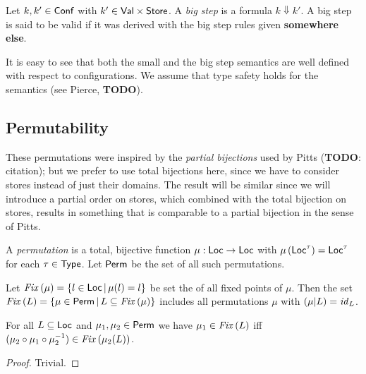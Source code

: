 \documentclass[12pt,a4paper]{report}
\newcommand{\Conf}{\sstyle{Conf}}
\newcommand{\id}{\nstyle{id}}
\newcommand{\Fix}[1]{\nstyle{Fix}\,(#1)}
\begin{document}
\begin{definition}
  Let $k,k'\in\Conf$ with $k' \in \mathsf{Val} \times \mathsf{Store}$. A {\em big step} is a formula
  $k \Downarrow k'$. A big step is said to be valid if it was derived with the
  big step rules given {\bf somewhere else}.
\end{definition}

It is easy to see that both the small and the big step semantics are well defined
with respect to configurations. We assume that type safety holds for the semantics
(see Pierce, {\bf TODO}).



\subsection{Permutability}

These permutations were inspired by the {\em partial bijections} used by Pitts ({\bf TODO}: citation);
but we prefer to use total bijections here, since we have to consider stores instead of just their domains.
The result will be similar since we will introduce a partial order on stores, which combined with the
total bijection on stores, results in something that is comparable to a partial bijection in the sense
of Pitts.

\begin{definition}[Permutation]
  A {\em permutation} is a total, bijective function $\mu:\mathsf{Loc}\to\mathsf{Loc}$ with
  $\mu\,(\mathsf{Loc}^\tau)=\mathsf{Loc}^\tau$ for each $\tau\in\mathsf{Type}$. Let $\mathsf{Perm}$ be the
  set of all such permutations.
\end{definition}

Let $\Fix{\mu} = \{l\in\Loc\,|\,\mu(l)=l\}$ be set the of all fixed points of $\mu$. Then
the set $\Fix{L} = \{\mu\in\Perm\,|\,L \subseteq \Fix{\mu}\}$ includes all
permutations $\mu$ with $(\mu|L) = \id_L$.

\begin{lemma}
  For all $L \subseteq \mathsf{Loc}$ and $\mu_1,\mu_2\in\mathsf{Perm}$ we have
  $\mu_1\in\Fix{L}$ iff $(\mu_2 \circ \mu_1 \circ \mu_2^{-1})\in\Fix{{\mu_2(L)}}$.
\end{lemma}

\begin{proof}
  Trivial.
\end{proof}
\end{document}
